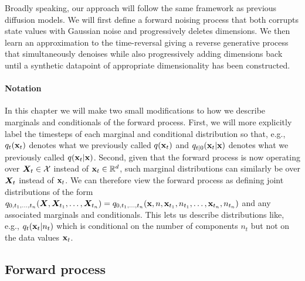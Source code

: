Broadly speaking, our approach will follow the same framework as previous diffusion models. We will first define a forward noising process that both corrupts state values with Gaussian noise and progressively deletes dimensions.
We then learn an approximation to the time-reversal giving a reverse generative process that simultaneously denoises while also progressively adding dimensions back until a synthetic datapoint of appropriate dimensionality has been constructed.

\paragraph{Notation}
In this chapter we will make two small modifications to how we describe marginals and conditionals of the forward process. First, we will more explicitly label the timesteps of each marginal and conditional distribution so that, e.g., $q_t({\mathbf{x}}_t)$ denotes what we previously called $q({\mathbf{x}}_t)$ and $q_{t|0}({\mathbf{x}}_t|{\mathbf{x}})$ denotes what we previously called $q({\mathbf{x}}_t|{\mathbf{x}})$. Second, given that the forward process is now operating over ${\bm{X}}_t \in {\mathcal{X}}$ instead of ${\mathbf{x}}_t \in \mathbb{R}^{d}$, such marginal distributions can similarly be over ${\bm{X}}_t$ instead of ${\mathbf{x}}_t$. We can therefore view the forward process as defining joint distributions of the form $q_{0,t_1,\ldots,t_n}({\bm{X}},{\bm{X}}_{t_1},\ldots,{\bm{X}}_{t_n}) = q_{0,t_1,\ldots,t_n}({\mathbf{x}},n,{\mathbf{x}}_{t_1},n_{t_1},\ldots,{\mathbf{x}}_{t_n},n_{t_n})$ and any associated marginals and conditionals. This lets us describe distributions like, e.g., $q_t({\mathbf{x}}_t|n_t)$ which is conditional on the number of components $n_t$ but not on the data values ${\mathbf{x}}_t$.

\subsection{Forward process}
\label{sec:tddm-jump-diff-proc}

